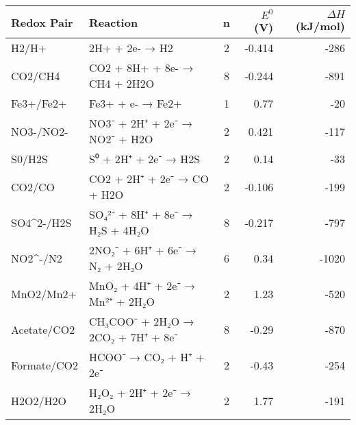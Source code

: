 \begin{tabular}{l l c r r}
\toprule
Redox Pair & Reaction & n & $E^0$ (V) & $\Delta H$ (kJ/mol) \\ 
\midrule
H2/H+ & 2H+ + 2e- → H2 & 2 & -0.414 & -286 \\ 
CO2/CH4 & CO2 + 8H+ + 8e- → CH4 + 2H2O & 8 & -0.244 & -891 \\ 
Fe3+/Fe2+ & Fe3+ + e- → Fe2+ & 1 & 0.77 & -20 \\ 
NO3-/NO2- & NO3⁻ + 2H⁺ + 2e⁻ → NO2⁻ + H2O & 2 & 0.421 & -117 \\ 
S0/H2S & S⁰ + 2H⁺ + 2e⁻ → H2S & 2 & 0.14 & -33 \\ 
CO2/CO & CO2 + 2H⁺ + 2e⁻ → CO + H2O & 2 & -0.106 & -199 \\ 
SO4^2-/H2S & SO₄²⁻ + 8H⁺ + 8e⁻ → H₂S + 4H₂O & 8 & -0.217 & -797 \\ 
NO2^-/N2 & 2NO₂⁻ + 6H⁺ + 6e⁻ → N₂ + 2H₂O & 6 & 0.34 & -1020 \\ 
MnO2/Mn2+ & MnO₂ + 4H⁺ + 2e⁻ → Mn²⁺ + 2H₂O & 2 & 1.23 & -520 \\ 
Acetate/CO2 & CH₃COO⁻ + 2H₂O → 2CO₂ + 7H⁺ + 8e⁻ & 8 & -0.29 & -870 \\ 
Formate/CO2 & HCOO⁻ → CO₂ + H⁺ + 2e⁻ & 2 & -0.43 & -254 \\ 
H2O2/H2O & H₂O₂ + 2H⁺ + 2e⁻ → 2H₂O & 2 & 1.77 & -191 \\ 
\bottomrule
\end{tabular}
